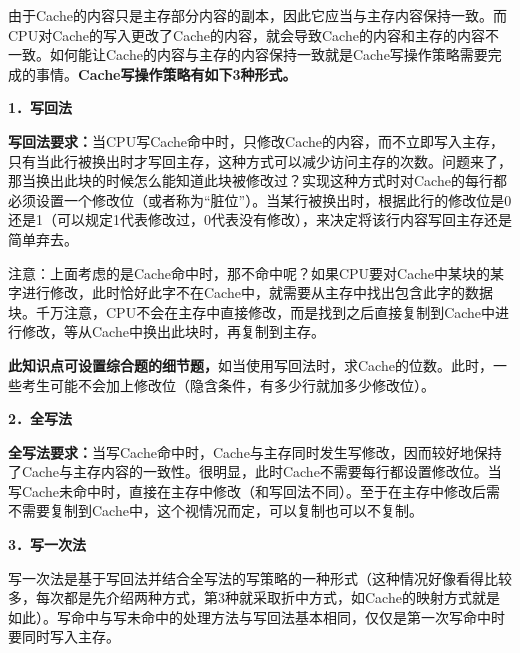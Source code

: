 由于Cache的内容只是主存部分内容的副本，因此它应当与主存内容保持一致。而CPU对Cache的写入更改了Cache的内容，就会导致Cache的内容和主存的内容不一致。如何能让Cache的内容与主存的内容保持一致就是Cache写操作策略需要完成的事情。\textbf{{Cache写操作策略有如下3种形式。}}

\textbf{1．写回法}

\textbf{写回法要求：}当CPU写Cache命中时，只修改Cache的内容，而不立即写入主存，只有当此行被换出时才写回主存，这种方式可以减少访问主存的次数。问题来了，那当换出此块的时候怎么能知道此块被修改过？实现这种方式时对Cache的每行都必须设置一个修改位（或者称为``脏位''）。当某行被换出时，根据此行的修改位是0还是1（可以规定1代表修改过，0代表没有修改），来决定将该行内容写回主存还是简单弃去。

{注意：上面考虑的是Cache命中时，那不命中呢？}如果CPU要对Cache中某块的某字进行修改，此时恰好此字不在Cache中，就需要从主存中找出包含此字的数据块。千万注意，CPU不会在主存中直接修改，而是找到之后直接复制到Cache中进行修改，等从Cache中换出此块时，再复制到主存。

\textbf{{此知识点可设置综合题的细节题，}}如当使用写回法时，求Cache的位数。此时，一些考生可能不会加上修改位（隐含条件，有多少行就加多少修改位）。

\textbf{2．全写法}

\textbf{全写法要求：}当写Cache命中时，Cache与主存同时发生写修改，因而较好地保持了Cache与主存内容的一致性。很明显，此时Cache不需要每行都设置修改位。当写Cache未命中时，直接在主存中修改（和写回法不同）。至于在主存中修改后需不需要复制到Cache中，这个视情况而定，可以复制也可以不复制。

\textbf{3．写一次法}

写一次法是基于写回法并结合全写法的写策略的一种形式（这种情况好像看得比较多，每次都是先介绍两种方式，第3种就采取折中方式，如Cache的映射方式就是如此）。写命中与写未命中的处理方法与写回法基本相同，仅仅是第一次写命中时要同时写入主存。
